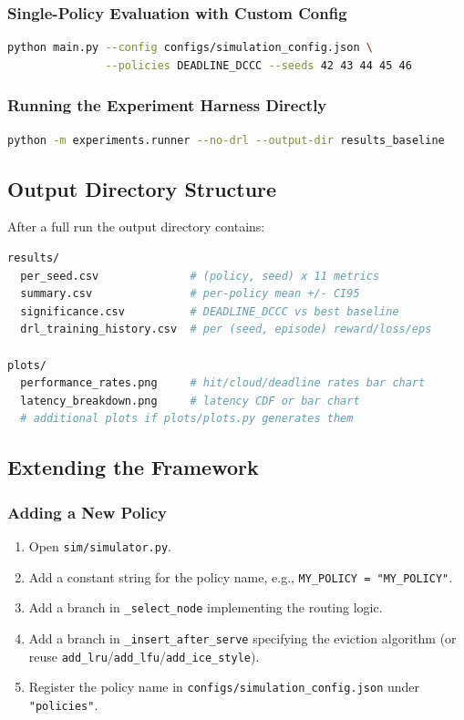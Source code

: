 \documentclass[12pt]{article}
\begin{document}
\subsubsection{Single-Policy Evaluation with Custom Config}

\begin{lstlisting}[style=shellstyle, language=bash]
python main.py --config configs/simulation_config.json \
               --policies DEADLINE_DCCC --seeds 42 43 44 45 46
\end{lstlisting}

\subsubsection{Running the Experiment Harness Directly}

\begin{lstlisting}[style=shellstyle, language=bash]
python -m experiments.runner --no-drl --output-dir results_baseline
\end{lstlisting}

\subsection{Output Directory Structure}

After a full run the output directory contains:

\begin{lstlisting}[style=shellstyle, language=bash]
results/
  per_seed.csv              # (policy, seed) x 11 metrics
  summary.csv               # per-policy mean +/- CI95
  significance.csv          # DEADLINE_DCCC vs best baseline
  drl_training_history.csv  # per (seed, episode) reward/loss/eps

plots/
  performance_rates.png     # hit/cloud/deadline rates bar chart
  latency_breakdown.png     # latency CDF or bar chart
  # additional plots if plots/plots.py generates them
\end{lstlisting}

\subsection{Extending the Framework}

\subsubsection{Adding a New Policy}

\begin{enumerate}
  \item Open \texttt{sim/simulator.py}.
  \item Add a constant string for the policy name, e.g., \texttt{MY\_POLICY = "MY\_POLICY"}.
  \item Add a branch in \texttt{\_select\_node} implementing the routing logic.
  \item Add a branch in \texttt{\_insert\_after\_serve} specifying the eviction algorithm (or reuse \texttt{add\_lru}/\texttt{add\_lfu}/\texttt{add\_ice\_style}).
  \item Register the policy name in \texttt{configs/simulation\_config.json} under \texttt{"policies"}.
\end{enumerate}
\end{document}
